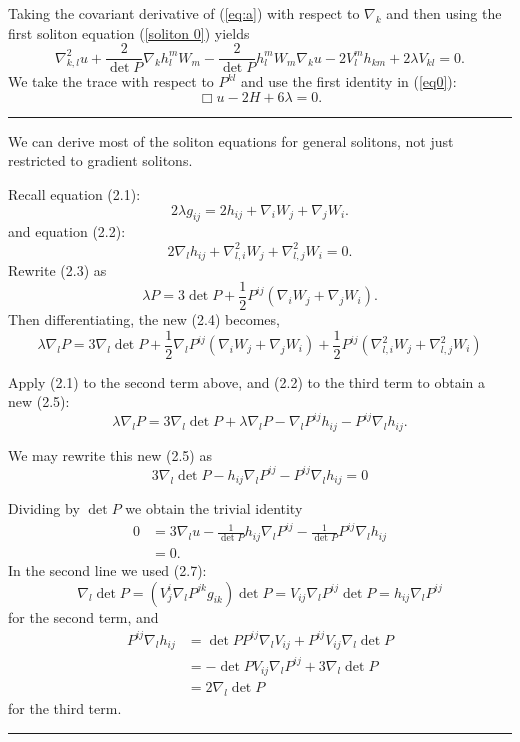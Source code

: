 \documentclass{amsart}
\theoremstyle{definition}
\theoremstyle{remark}
\numberwithin{equation}{section}
\newenvironment{note}{\hrule}{\hrule}
\begin{document}
Taking the covariant derivative of (\ref{eq:a}) with respect to $\nabla_k$ and then using the first soliton equation (\ref{soliton 0}) yields
\begin{equation*}
\nabla^2_{k,l}u+\frac{2}{\det P}\nabla_kh_l^mW_m-\frac{2}{\det P}h_l^mW_m\nabla_ku-2V_l^mh_{km}+2\lambda V_{kl}=0.
\end{equation*}
We take the trace with respect to $P^{kl}$ and use the first identity in (\ref{eq0}):
\begin{equation}\label{eq:5}
\Box u-2H+6\lambda=0.
\end{equation}

\begin{note}
We can derive most of the soliton equations for general solitons, not just restricted to gradient solitons.

Recall equation (2.1):
\[
2\lambda g_{ij}=2h_{ij}+\nabla_iW_j+\nabla_jW_i.
\]
and equation (2.2):
\[
2\nabla_lh_{ij}+\nabla^2_{l,i}W_j+\nabla^2_{l,j}W_i=0.
\]
Rewrite (2.3) as
\[
\lambda P = 3 \det P + \frac{1}{2}P^{ij} \left(\nabla_i W_j + \nabla_j W_i\right).
\]
Then differentiating, the new (2.4) becomes,
\[
\lambda \nabla_l P = 3 \nabla_l \det P + \frac{1}{2}\nabla_l P^{ij} \left(\nabla_i W_j + \nabla_j W_i\right) + \frac{1}{2} P^{ij} \left(\nabla^2_{l,i} W_j + \nabla^2_{l,j} W_i\right)
\]

Apply (2.1) to the second term above, and (2.2) to the third term to obtain a new (2.5):
\[
\lambda \nabla_l P = 3 \nabla_l \det P + \lambda \nabla_l P - \nabla_l P^{ij}h_{ij} - P^{ij} \nabla_l h_{ij}.
\]

We may rewrite this new (2.5) as
\[
3 \nabla_l \det P - h_{ij} \nabla_l P^{ij} - P^{ij} \nabla_l h_{ij} = 0 
\]

Dividing by \(\det P\) we obtain the trivial identity
\begin{align*}
0 &= 3 \nabla_l u - \frac{1}{\det P} h_{ij} \nabla_l P^{ij} - \frac{1}{\det P} P^{ij} \nabla_l h_{ij} \\
&= 0.
\end{align*}
In the second line we used (2.7):
\[
\nabla_l \det P = (V^i_j \nabla_l P^{jk} g_{ik}) \det P = V_{ij} \nabla_l P^{ij} \det P = h_{ij} \nabla_l P^{ij}
\]
for the second term, and
\begin{align*}
P^{ij} \nabla_l h_{ij} &= \det P P^{ij} \nabla_l V_{ij} + P^{ij} V_{ij} \nabla_l \det P \\
&= -\det P V_{ij} \nabla_l P^{ij} + 3 \nabla_l \det P \\
&= 2 \nabla_l \det P
\end{align*}
for the third term.


\end{note}
\end{document}
